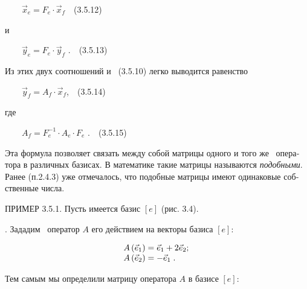 \documentclass[a4paper]{article}
\begin{document}
{\begin{russian}\sffamily
\ \ \ \  $\vec x_e=F_e\cdot \vec x_f$\ \ (3.5.12)
\end{russian}}

{\begin{russian}\sffamily
и
\end{russian}}

{\begin{russian}\sffamily
\ \ \ \  $\vec y_e=F_e\cdot \vec y_f$ .\ \ (3.5.13) \ 
\end{russian}}

{\begin{russian}\sffamily
Из этих двух соотношений и \ (3.5.10) легко выводится равенство 
\end{russian}}

{\begin{russian}\sffamily
\ \ \ \  $\vec y_f=A_f\cdot \vec x_f$,\ \ (3.5.14)
\end{russian}}

{\begin{russian}\sffamily
где
\end{russian}}

{\begin{russian}\sffamily
\ \ \ \  $A_f=F_e^{-1}\cdot A_e\cdot F_e$ .\ \ (3.5.15)
\end{russian}}

{\begin{russian}\sffamily
Эта формула позволяет связать между собой матрицы одного и того же \ оператора в различных базисах. В математике такие
матрицы называются \textit{подобными}. Ранее (п.2.4.3) уже отмечалось, что подобные матрицы имеют одинаковые
собственные числа. \ \ \ \ 
\end{russian}}


\bigskip

{\begin{russian}\sffamily
ПРИМЕР 3.5.1. Пусть имеется базис  $[e]$ (рис. 3.4).
\end{russian}}

{\begin{russian}. Зададим \ оператор  $A$ его действием на векторы базиса  $[e]$:
\end{russian}}

\begin{equation*}
\begin{matrix}A\left(\vec e_1\right)=\vec e_1+2\vec e_2;\hfill\null \\A\left(\vec e_2\right)=-\vec e_1\;.\hfill\null
\end{matrix}\hfill 
\end{equation*}
{\begin{russian}\sffamily
Тем самым мы определили матрицу оператора  $A$ в базисе $[e]$:
\end{russian}}
\end{document}
